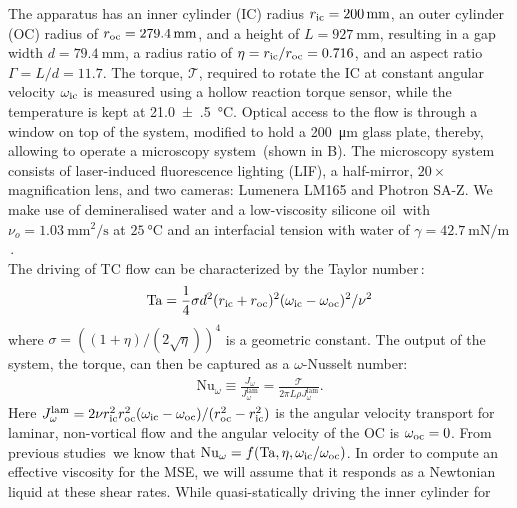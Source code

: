 %
The apparatus has an inner cylinder (IC) radius $r_\text{ic}=\SI{200}{\milli\meter}$,
an outer cylinder (OC) radius of $r_\text{oc}=\SI{279.4}{\milli\meter}$, and a height
of $L=\SI{927}{\milli\meter}$, resulting in a gap width
$d=\SI{79.4}{\milli\meter}$, a radius ratio of $\eta=r_\text{ic}/r_\text{oc}=0.716$, and an
aspect ratio $\Gamma=L/d = 11.7$.
The torque, $\mathcal{T}$, required to rotate the IC at constant angular
velocity $\omega_\text{ic}$ is measured using a hollow reaction torque sensor,
while the temperature is kept at \SI[separate-uncertainty =
true,multi-part-units=single]{21.0(5)}{\celsius}.
Optical access to the flow is through a window on top of the system, modified
to hold a \SI{200}{\micro\metre} glass plate, thereby, allowing to operate a
microscopy system~(shown in B).
The microscopy system consists of laser-induced fluorescence lighting (LIF),
a half-mirror, $20\times$ magnification lens, and two cameras: Lumenera LM165 and Photron SA-Z.
We make use of demineralised water and a low-viscosity silicone oil\,\cite{ShinEtsuKF96} with
$\nu_o=\SI{1.03}{\milli\meter\squared\per\second}$ at $\SI{25}{\celsius}$ and an interfacial tension with water of $\gamma =\SI{42.7}{\milli\newton\per\metre}$\,\cite{Kanellopoulos1971}.\\
\indent The driving of TC flow can be characterized by the Taylor
number\,\cite{Eckhardt2007}:
\begin{align}
    \text{Ta} = \frac 14 \sigma d^2 (r_\text{ic} + r_\text{oc})^2 (\omega_\text{ic} - \omega_\text{oc})^2 /
    \nu^2
    \label{eq:oilTa}
\end{align}
where $\sigma = ((1+\eta)/(2\sqrt \eta))^4$ is a geometric constant.  The
output of the system, the torque, can then be captured as a $\omega$-Nusselt
number:
\begin{align}
    \text{Nu}_\omega \equiv  \frac{J_\omega}{J^{\text{lam}}_{\omega}} =
    \frac{\mathcal{T}}{2\pi L \rho J^{\text{lam}}_{\omega}}.
    \label{eq:oilNu}
\end{align}
Here $J^{\text{lam}}_{\omega} = 2 \nu r_\text{ic}^2 r_\text{oc}^2(\omega_\text{ic} - \omega_\text{oc})/(r_\text{oc}^2 - r_\text{ic}^2)$ is the angular velocity transport for laminar, non-vortical flow and the angular velocity of the OC is $\omega_\text{oc}=0$.
From previous studies\,\cite{vanGils2011b,Paoletti2011,Huisman2012b, Ostilla-Monico2014b, Huisman2014,Grossmann2016}
we know that $\text{Nu}_\omega=f(\text{Ta},\eta,\omega_\text{ic}/\omega_\text{oc})$.
In order to compute an effective viscosity for the MSE, we will assume that it responds as a Newtonian liquid at these shear rates. 
While quasi-statically driving the inner cylinder for
